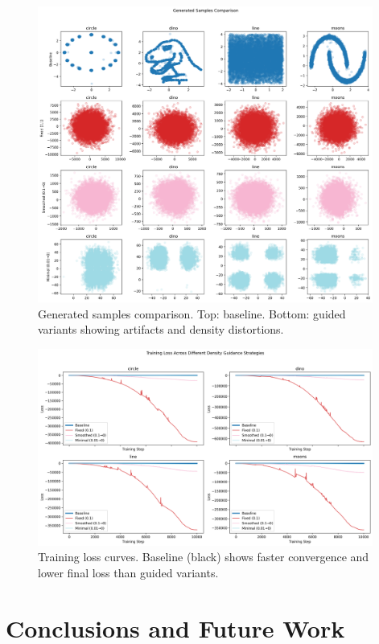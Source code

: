 \documentclass{article} %
\begin{document}
\begin{figure}[t]
\centering
\includegraphics[width=0.98\textwidth]{generated_samples.png}
\caption{Generated samples comparison. Top: baseline. Bottom: guided variants showing artifacts and density distortions.}
\label{fig:generated_samples}
\end{figure}

\begin{figure}[t]
\centering
\includegraphics[width=0.98\textwidth]{train_loss.png}
\caption{Training loss curves. Baseline (black) shows faster convergence and lower final loss than guided variants.}
\label{fig:train_loss}
\end{figure}

\section{Conclusions and Future Work}
\label{sec:conclusion}
\end{document}
